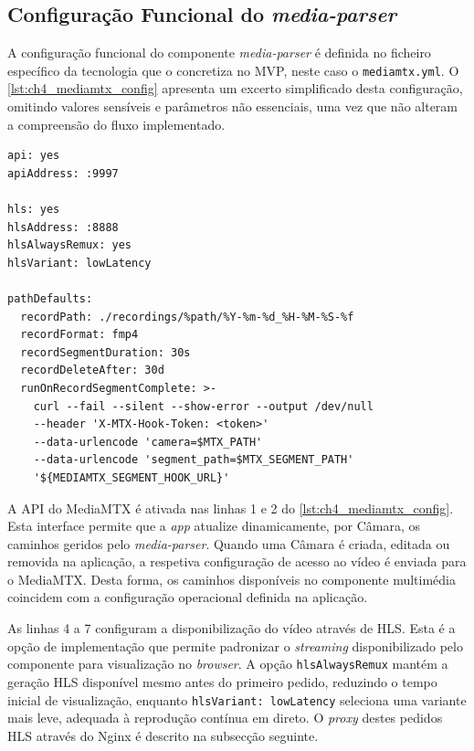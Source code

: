 \subsection{Configuração Funcional do \textit{media-parser}}

A configuração funcional do componente \textit{media-parser} é definida no ficheiro específico da tecnologia que o concretiza no \gls{MVP}, neste caso o \texttt{mediamtx.yml}. O \autoref{lst:ch4_mediamtx_config} apresenta um excerto simplificado desta configuração, omitindo valores sensíveis e parâmetros não essenciais, uma vez que não alteram a compreensão do fluxo implementado.

\par\noindent\begin{minipage}{\linewidth}
\begin{lstlisting}[caption={Excerto simplificado da configuração funcional do MediaMTX (yaml)},label={lst:ch4_mediamtx_config}]
api: yes
apiAddress: :9997

hls: yes
hlsAddress: :8888
hlsAlwaysRemux: yes
hlsVariant: lowLatency

pathDefaults:
  recordPath: ./recordings/%path/%Y-%m-%d_%H-%M-%S-%f
  recordFormat: fmp4
  recordSegmentDuration: 30s
  recordDeleteAfter: 30d
  runOnRecordSegmentComplete: >-
    curl --fail --silent --show-error --output /dev/null
    --header 'X-MTX-Hook-Token: <token>'
    --data-urlencode 'camera=$MTX_PATH'
    --data-urlencode 'segment_path=$MTX_SEGMENT_PATH'
    '${MEDIAMTX_SEGMENT_HOOK_URL}'
\end{lstlisting}
\end{minipage}

A \gls{API} do MediaMTX é ativada nas linhas 1 e 2 do \autoref{lst:ch4_mediamtx_config}. Esta interface permite que a \textit{app} atualize dinamicamente, por Câmara, os caminhos geridos pelo \textit{media-parser}. Quando uma Câmara é criada, editada ou removida na aplicação, a respetiva configuração de acesso ao vídeo é enviada para o MediaMTX. Desta forma, os caminhos disponíveis no componente multimédia coincidem com a configuração operacional definida na aplicação.

As linhas 4 a 7 configuram a disponibilização do vídeo através de \gls{HLS}. Esta é a opção de implementação que permite padronizar o \textit{streaming} disponibilizado pelo componente para visualização no \textit{browser}. A opção \texttt{hlsAlwaysRemux} mantém a geração \gls{HLS} disponível mesmo antes do primeiro pedido, reduzindo o tempo inicial de visualização, enquanto \texttt{hlsVariant: lowLatency} seleciona uma variante mais leve, adequada à reprodução contínua em direto. O \textit{proxy} destes pedidos \gls{HLS} através do Nginx é descrito na subsecção seguinte.

